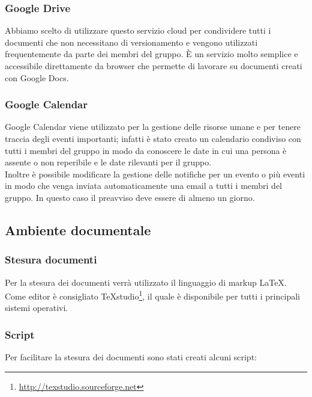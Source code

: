 \subsubsection{Google Drive}

Abbiamo scelto di utilizzare questo \gls{servizio cloud} per condividere tutti i documenti che non necessitano di \gls{versionamento} e vengono utilizzati frequentemente da parte dei membri del gruppo. 
È un servizio molto semplice e accessibile direttamente da \gls{browser} che permette di lavorare su documenti creati con \gls{Google Docs}.

\subsubsection{Google Calendar}
\gls{Google Calendar} viene utilizzato per la gestione delle risorse umane e per tenere traccia degli eventi importanti; infatti è stato creato un calendario condiviso con tutti i membri del gruppo in modo da conoscere le date in cui una persona è assente o non reperibile e le date rilevanti per il gruppo.\\
Inoltre è possibile modificare la gestione delle notifiche per un evento o più eventi in modo che venga inviata automaticamente una email a tutti i membri del gruppo. In questo caso il preavviso deve essere di almeno un giorno.

\subsection{Ambiente documentale}

\subsubsection{Stesura documenti}

Per la stesura dei documenti verrà utilizzato il \gls{linguaggio di markup} \LaTeX.
Come editor è consigliato TeXstudio\footnote{\url{http://texstudio.sourceforge.net}}, il quale è disponibile per tutti i principali sistemi operativi.

\subsubsection{Script}

Per facilitare la stesura dei documenti sono stati creati alcuni script:

